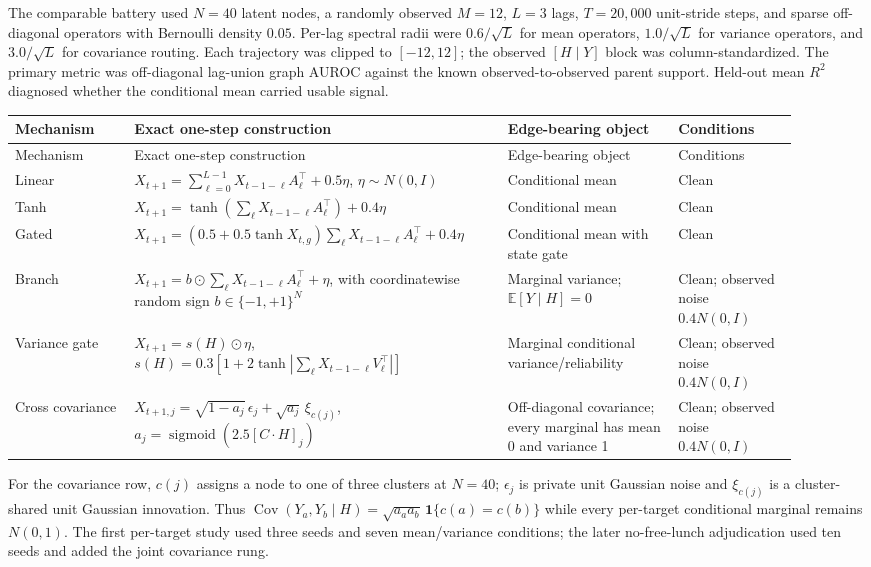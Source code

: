 \documentclass[10pt]{article}
\newcommand{\E}{\mathbb{E}}
\begin{document}
The comparable battery used $N=40$ latent nodes, a randomly observed $M=12$, $L=3$ lags, $T=20{,}000$ unit-stride steps, and sparse off-diagonal operators with Bernoulli density $0.05$. Per-lag spectral radii were $0.6/\sqrt L$ for mean operators, $1.0/\sqrt L$ for variance operators, and $3.0/\sqrt L$ for covariance routing. Each trajectory was clipped to $[-12,12]$; the observed $[H\mid Y]$ block was column-standardized. The primary metric was off-diagonal lag-union graph AUROC against the known observed-to-observed parent support. Held-out mean $R^2$ diagnosed whether the conditional mean carried usable signal.

\begin{longtable}{L{0.14\linewidth}L{0.43\linewidth}L{0.20\linewidth}L{0.14\linewidth}}
\toprule
Mechanism & Exact one-step construction & Edge-bearing object & Conditions \\
\midrule
\endfirsthead
\toprule Mechanism & Exact one-step construction & Edge-bearing object & Conditions \\
\midrule\endhead
Linear & $X_{t+1}=\sum_{\ell=0}^{L-1}X_{t-1-\ell}A_\ell^\top+0.5\eta$, $\eta\sim N(0,I)$ & Conditional mean & Clean \\
Tanh & $X_{t+1}=\tanh(\sum_\ell X_{t-1-\ell}A_\ell^\top)+0.4\eta$ & Conditional mean & Clean \\
Gated & $X_{t+1}=(0.5+0.5\tanh X_{t,g})\sum_\ell X_{t-1-\ell}A_\ell^\top+0.4\eta$ & Conditional mean with state gate & Clean \\
Branch & $X_{t+1}=b\odot\sum_\ell X_{t-1-\ell}A_\ell^\top+\eta$, with coordinatewise random sign $b\in\{-1,+1\}^N$ & Marginal variance; $\E[Y\mid H]=0$ & Clean; observed noise $0.4N(0,I)$ \\
Variance gate & $X_{t+1}=s(H)\odot\eta$, $s(H)=0.3[1+2\tanh|\sum_\ell X_{t-1-\ell}V_\ell^\top|]$ & Marginal conditional variance/reliability & Clean; observed noise $0.4N(0,I)$ \\
Cross covariance & $X_{t+1,j}=\sqrt{1-a_j}\,\epsilon_j+\sqrt{a_j}\,\xi_{c(j)}$, $a_j=\operatorname{sigmoid}(2.5[C\!\cdot\!H]_j)$ & Off-diagonal covariance; every marginal has mean 0 and variance 1 & Clean; observed noise $0.4N(0,I)$ \\
\bottomrule
\end{longtable}

For the covariance row, $c(j)$ assigns a node to one of three clusters at $N=40$; $\epsilon_j$ is private unit Gaussian noise and $\xi_{c(j)}$ is a cluster-shared unit Gaussian innovation. Thus $\operatorname{Cov}(Y_a,Y_b\mid H)=\sqrt{a_a a_b}\,\mathbf 1\{c(a)=c(b)\}$ while every per-target conditional marginal remains $N(0,1)$. The first per-target study used three seeds and seven mean/variance conditions; the later no-free-lunch adjudication used ten seeds and added the joint covariance rung.
\end{document}
